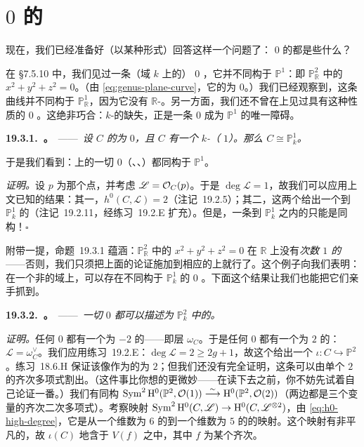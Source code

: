 
\section{\trGenus{} $0$ 的\trCurve}

现在，我们已经准备好（以某种形式）回答这样一个问题了：\trGenus{} $0$ 的\trCurve{}都是些什么？

在 \S7.5.10 中，我们见过一条（域 $k$ 上的）\trGenus{} $0$ \trCurve，它并不同构于 $\mathbb{P}^1$：即 $\mathbb{P}^2_\mathbb{R}$ 中的 $x^2+y^2+z^2=0$。（由 \eqref{eq:genus-plane-curve}，它的\trGenus{}为 $0$。）我们已经观察到，这条曲线并不同构于 $\mathbb{P}^1_\mathbb{R}$，因为它没有 $\mathbb{R}$-\trValuedPoint。另一方面，我们还不曾在\trAlgClosedField{}上见过具有这种性质的\trGenus{} $0$ \trCurve。这绝非巧合：$k$-\trValuedPoint{}的缺失，正是一条\trGenus{} $0$ \trCurve{}成为 $\mathbb{P}^1$ 的唯一障碍。

\textbf{19.3.1.\ \trhProposition。}\ ——\ \emph{设 $C$ 的\trGenus{}为 $0$，且 $C$ 有一个 $k$-\trValuedPoint（\trDegree{} $1$）。那么 $C\cong\mathbb{P}^1_k$。}

于是我们看到：\trAlgClosedField{}上的一切\trGenus{} $0$（\trIntegral、\trRegular、\trProjective）\trCurve{}都同构于 $\mathbb{P}^1$。

\emph{证明。}\quad 设 $p$ 为那个点，并考虑 $\mathscr{L}=\mathcal{O}_C(p)$。于是 $\deg\mathscr{L}=1$，故我们可以应用上文已知的结果：其一，$h^0(C,\mathscr{L})=2$（\mbox{注记~19.2.5}）；其二，这两个\trSection{}给出一个到 $\mathbb{P}^1_k$ 的\trClosedEmbedding（\mbox{注记~19.2.11}，经\mbox{练习~19.2.E} 扩充）。但是，一条\trCurve{}到\trIntegral\trCurve{} $\mathbb{P}^1_k$ 之内的\trClosedEmbedding{}只能是同构！\hfill$\square$

附带一提，\mbox{命题~19.3.1} 蕴涵：$\mathbb{P}^2_\mathbb{R}$ 中的 $x^2+y^2+z^2=0$ 在 $\mathbb{R}$ 上没有\emph{次数 $1$ 的\trLineBundle}——否则，我们只须把上面的论证施加到相应的\trLineBundle{}上就行了。这个例子向我们表明：在一个非\trAlgClosed{}的域上，可以存在不同构于 $\mathbb{P}^1_k$ 的\trGenus{} $0$ \trCurve。下面这个结果让我们也能把它们亲手抓到。

\textbf{19.3.2.\ \trhClaim。}\ ——\ \emph{一切\trGenus{} $0$ \trCurve{}都可以描述为 $\mathbb{P}^2_k$ 中的\trConic。}

\emph{证明。}\quad 任何\trGenus{} $0$ \trCurve{}都有一个\trDegree{}为 $-2$ 的\trLineBundle——即\trCanonical{}层 $\omega_C$。于是任何\trGenus{} $0$ \trCurve{}都有一个\trDegree{}为 $2$ 的\trLineBundle：$\mathscr{L}=\omega_C^{\vee}$。我们应用\mbox{练习~19.2.E}：$\deg\mathscr{L}=2\ge 2g+1$，故这个\trLineBundle{}给出一个\trClosedEmbedding{} $\iota\colon C\hookrightarrow\mathbb{P}^2$。\mbox{练习~18.6.H} 保证该像作为\trClosedSubscheme{}的\trDegree{}为 $2$；但我们还没有完全证明，这条\trCurve{}可以由单个\trDegree{} $2$ 的齐次多项式割出。（这件事比你想的更微妙——在读下去之前，你不妨先试着自己论证一番。）我们有同构 $\operatorname{Sym}^2\mathrm{H}^0(\mathbb{P}^2,\mathcal{O}(1))\overset{\sim}{\longrightarrow}\mathrm{H}^0(\mathbb{P}^2,\mathcal{O}(2))$（两边都是三个变量的齐次二次多项式）。考察映射 $\operatorname{Sym}^2\mathrm{H}^0(C,\mathscr{L})\to\mathrm{H}^0(C,\mathscr{L}^{\otimes 2})$，由 \eqref{eq:h0-high-degree}，它是从一个维数为 $6$ 的\trVectorSpace{}到一个维数为 $5$ 的\trVectorSpace{}的映射。这个映射有非平凡的\trKernel，故 $\iota(C)$ \trSchemeTheoretic{}地含于 $V(f)$ 之中，其中 $f$ 为某个齐次\trConic。

